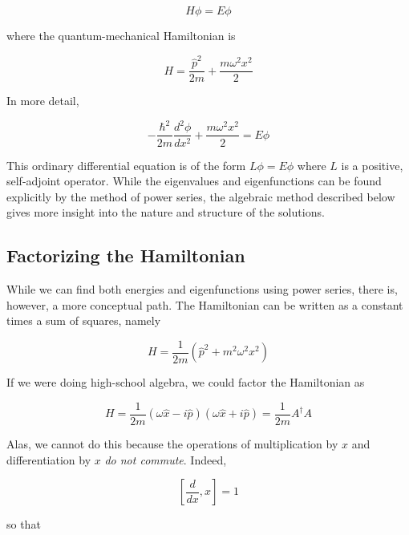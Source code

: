 \begin{equation}
H\phi =E\phi
\end{equation}

where the quantum-mechanical Hamiltonian is

\begin{equation}
  H =  \frac{\hat p^2}{2m} + \frac{m\omega^2 x^2  }{2}
\end{equation}

In more detail,

\begin{equation}
- \frac{\hbar^2}{2m} \frac{d^2 \phi}{dx^2}
  + \frac{m\omega^2 x^2  }{2} = E\phi
\end{equation}


This ordinary differential equation is of the form $L\phi = E\phi$
where $L$ is a positive, self-adjoint operator.  
While the eigenvalues and eigenfunctions
can be found explicitly by the method of power series,
the algebraic method described below gives more insight into the nature and structure of the solutions.

\subsection{Factorizing the Hamiltonian}

While we can find both energies and eigenfunctions using power series, there is, however, a more conceptual path.  The Hamiltonian can be written as a constant times a sum of squares, namely

\begin{equation}
H =  \frac{1}{2m}\left( \hat p^2  + m^2 \omega^2 x^2 \right)
\end{equation}

If we were doing high-school algebra, we could factor the Hamiltonian as

\begin{equation}
H = \frac{1}{2m}
      \left(\omega \hat x - i \hat p \right)
   \left(\omega \hat x + i \hat p \right)
  =  \frac{1}{2m} A^\dagger A
\end{equation}

Alas, we cannot do this because the operations of multiplication by $x$ and differentiation by $x$ \emph{do not commute}. Indeed,

\begin{equation}
  \left[\frac{d}{dx}, x\right] = 1
\end{equation}

so that

